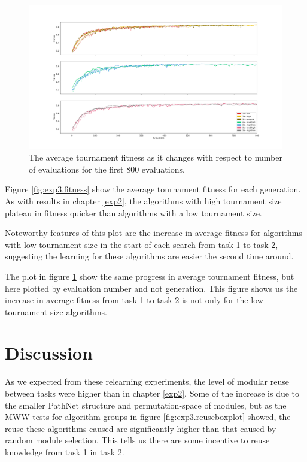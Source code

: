 \begin{figure}
    \includegraphics[width=1.25\textwidth, center]{Chapters/4.Experiments/exp3/figures/fitness_by_evaluations.pdf}
    \caption[Average tournament fitness plotted by evaluation]{The average tournament fitness as it changes with respect to number of evaluations for the first 800 evaluations.}
    \label{fig:exp3.fitness_by_evaluations}
\end{figure}

Figure \ref{fig:exp3.fitness} show the average tournament fitness for each generation. As with results in chapter \ref{exp2}, the algorithms with high tournament size plateau in fitness quicker than algorithms with a low tournament size.

Noteworthy features of this plot are the increase in average fitness for algorithms with low tournament size in the start of each search from task 1 to task 2, suggesting the learning for these algorithms are easier the second time around. 

The plot in figure \ref{fig:exp3.fitness_by_evaluations} show the same progress in average tournament fitness, but here plotted by evaluation number and not generation. This figure shows us the increase in average fitness from task 1 to task 2 is not only for the low tournament size algorithms. 

\section{Discussion}
As we expected from these relearning experiments, the level of modular reuse between tasks were higher than in chapter \ref{exp2}. Some of the increase is due to the smaller PathNet structure and permutation-space of modules, but as the MWW-tests for algorithm groups in figure \ref{fig:exp3.reuseboxplot} showed, the reuse these algorithms caused are significantly higher than that caused by random module selection. This tells us there are some incentive to reuse knowledge from task 1 in task 2.


